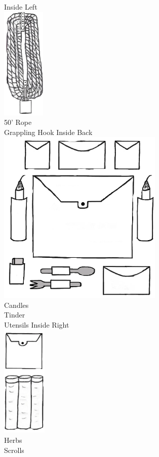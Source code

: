 \documentclass[11pt]{article}
\begin{document}
\begin{paracol}{3}
    \centering
    \normalsize{Inside Left}\\
    \includegraphics[height=5.4cm]{img/rope.png}\\
    \normalsize{50' Rope\\Grappling Hook}
    \switchcolumn
    \centering 
    \normalsize{Inside Back}\\
    \includegraphics[height=8.4cm]{img/CandlesTinder.png}\\
    \normalsize{Candles\\Tinder\\Utensils}
    \switchcolumn
    \centering
    \normalsize{Inside Right}\\
    \includegraphics[height=5.4cm]{img/Scrolls-herbs.png}\\
    \normalsize{Herbs\\Scrolls}
\end{paracol}
\end{document}
